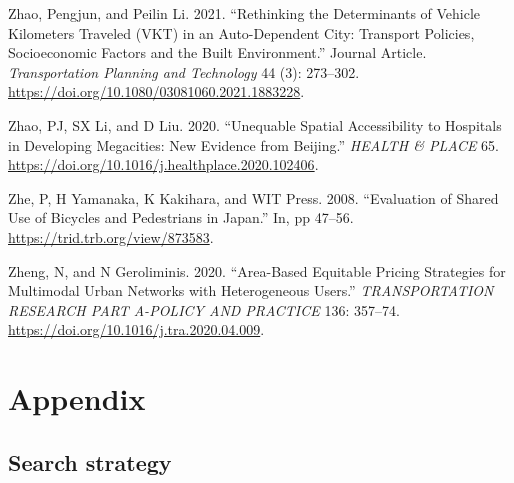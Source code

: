 \documentclass[12pt, oneside]{report}
\newlength{\cslhangindent}
\newlength{\cslentryspacingunit} %
\newenvironment{CSLReferences}[2] %
 {%
  \setlength{\parindent}{0pt}
  \ifodd #1
  \let\oldpar\par
  \def\par{\hangindent=\cslhangindent\oldpar}
  \fi
  \setlength{\parskip}{#2\cslentryspacingunit}
 }%
 {}
\begin{document}
\begin{CSLReferences}{1}{0}
\leavevmode{}%
Zhao, Pengjun, and Peilin Li. 2021. {``Rethinking the Determinants of
Vehicle Kilometers Traveled (VKT) in an Auto-Dependent City: Transport
Policies, Socioeconomic Factors and the Built Environment.''} Journal
Article. \emph{Transportation Planning and Technology} 44 (3): 273--302.
\url{https://doi.org/10.1080/03081060.2021.1883228}.

\leavevmode{}%
Zhao, PJ, SX Li, and D Liu. 2020. {``Unequable Spatial Accessibility to
Hospitals in Developing Megacities: {New} Evidence from {Beijing}.''}
\emph{HEALTH \& PLACE} 65.
\url{https://doi.org/10.1016/j.healthplace.2020.102406}.

\leavevmode{}%
Zhe, P, H Yamanaka, K Kakihara, and WIT Press. 2008. {``Evaluation of
{Shared Use} of {Bicycles} and {Pedestrians} in {Japan}.''} In, pp
47--56. \url{https://trid.trb.org/view/873583}.

\leavevmode{}%
Zheng, N, and N Geroliminis. 2020. {``Area-Based Equitable Pricing
Strategies for Multimodal Urban Networks with Heterogeneous Users.''}
\emph{TRANSPORTATION RESEARCH PART A-POLICY AND PRACTICE} 136: 357--74.
\url{https://doi.org/10.1016/j.tra.2020.04.009}.

\end{CSLReferences}

\newpage

\hypertarget{sect8}{%
\section{Appendix}\label{sect8}}

\hypertarget{search-strategy-1}{%
\subsection{Search strategy}\label{search-strategy-1}}
\end{document}
